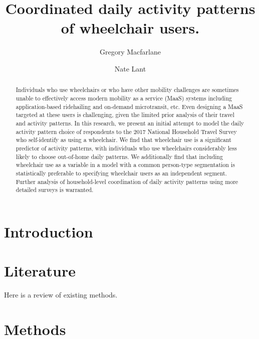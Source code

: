 \documentclass[]{elsarticle} %
\begin{document}
\begin{frontmatter}

  \title{Coordinated daily activity patterns of wheelchair users.}
    \author[Brigham Young University]{Gregory Macfarlane}
    \author[Brigham Young University]{Nate Lant}
      \address[Brigham Young University]{Civil and Environmental Engineering Department, 430 Engineering Building, Provo, Utah 84602}
  
  \begin{abstract}
  Individuals who use wheelchairs or who have other mobility challenges are sometimes unable to effectively access modern mobility as a service (MaaS) systems including application-based ridehailing and on-demand microtransit, etc. Even designing a MaaS targeted at these users is challenging, given the limited prior analysis of their travel and activity patterns. In this research, we present an initial attempt to model the daily activity pattern choice of respondents to the 2017 National Household Travel Survey who self-identify as using a wheelchair. We find that wheelchair use is a significant predictor of activity patterns, with individuals who use wheelchairs considerably less likely to choose out-of-home daily patterns. We additionally find that including wheelchair use as a variable in a model with a common person-type segmentation is statistically preferable to specifying wheelchair users as an independent segment. Further analysis of household-level coordination of daily activity patterns using more detailed surveys is warranted.
  \end{abstract}
  
 \end{frontmatter}

\hypertarget{intro}{%
\section{Introduction}\label{intro}}

\hypertarget{literature}{%
\section{Literature}\label{literature}}

Here is a review of existing methods.

\hypertarget{methods}{%
\section{Methods}\label{methods}}
\end{document}
